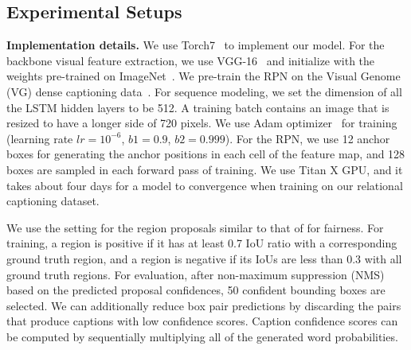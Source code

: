 \subsection{Experimental Setups}
\label{sec:exp_setup}
\noindent\textbf{Implementation details.}
We use Torch7~\cite{collobert2011torch7} to implement our model.
For the {backbone} visual feature extraction, we use VGG-16~\cite{simonyan2014very} and initialize with the weights pre-trained on ImageNet~\cite{russakovsky2015imagenet}.
We pre-train the RPN on the Visual Genome (VG) dense captioning data~\cite{krishna2017visual}. 
For sequence modeling, we set the {dimension} of 
all the LSTM hidden layers
to be 512.
A training batch contains an image that is resized to have a longer side of 720 pixels. 
We use Adam optimizer~\cite{ba2015adam} for training (learning rate $lr {=} 10^{-6}$, $b1{=}0.9$, $b2{=}0.999$).
For the RPN, we use 12 anchor boxes for generating the anchor positions in each cell of the feature map, and 128 boxes are sampled in each forward pass of training.
We use Titan X GPU, and it takes about four days for a model to convergence when training on our relational captioning dataset.



We use the setting for the region proposals similar to that of \cite{johnson2016densecap} for fairness.
For training, a region is positive if it has 
{at least 0.7 IoU ratio with a corresponding ground truth region,}
and 
{a region is negative if its IoUs are less than 0.3 with all ground truth regions.}
For evaluation, after non-maximum suppression (NMS) based on the predicted proposal confidences, 50 confident bounding boxes are selected.  
{We can additionally reduce box pair predictions by discarding the pairs that produce captions with low 
confidence scores.
Caption confidence scores can be computed by sequentially multiplying all of the generated word probabilities.}






